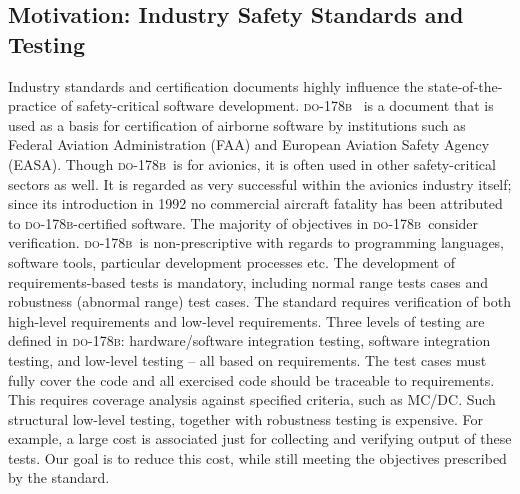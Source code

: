 \documentclass[sttt,final]{svjour}
\newcommand{\DOB}{\textsc{do-178b}}
\begin{document}
\subsection{Motivation: Industry Safety Standards and Testing}
Industry standards and certification documents highly influence the
state-of-the-practice of safety-critical software development. \DOB\
\cite{do178b} is a document that is used as a basis for certification
of airborne software by institutions such as Federal Aviation
Administration (FAA) and European Aviation Safety Agency
(EASA). Though \DOB\ is for avionics, it is often used in other
safety-critical sectors as well. It is regarded as very successful
within the avionics industry itself; since its introduction in 1992 no
commercial aircraft fatality has been attributed to \DOB-certified
software. The majority of objectives in \DOB\ consider
verification. \DOB\ is non-prescriptive with regards to programming
languages, software tools, particular development processes etc. The
development of requirements-based tests is mandatory, including normal
range tests cases and robustness (abnormal range) test cases. The
standard requires verification of both high-level requirements and
low-level requirements. Three levels of testing are defined in \DOB:
hardware/software integration testing, software integration testing,
and low-level testing -- all based on requirements. The test cases must
fully cover the code and all exercised code should be traceable to
requirements. This requires coverage analysis against specified
criteria, such as MC/DC. Such
structural low-level testing, together with robustness testing is
expensive. For example, a large cost is associated just for collecting
and verifying output of these tests. Our goal is to reduce this cost,
while still meeting the objectives prescribed by the standard.
\end{document}
